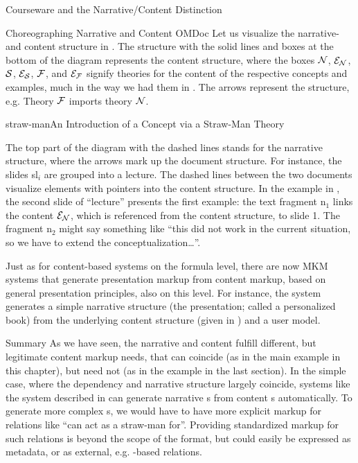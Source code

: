 \begin{tchapter}[id=courseware]{Courseware and the Narrative/Content Distinction}
\begin{tsection}[id=choreographing]{Choreographing  Narrative and Content OMDoc}
Let us visualize the narrative- and content structure in {}. The
structure with the solid lines and boxes at the bottom of the diagram represents the
content structure, where the boxes $\cal N$, $\cal E_N$, $\cal S$, $\cal E_S$,
$\cal F$, and $\cal E_F$ signify theories for the content of the respective
concepts and examples, much in the way we had them in
{}. The arrows represent the
{} structure, e.g. Theory $\cal F$ imports theory
$\cal N$.

\begin{myfig}{straw-man}{An Introduction of a Concept via a Straw-Man Theory}
  
\end{myfig}

The top part of the diagram with the dashed lines stands for the narrative structure,
where the arrows mark up the document structure. For instance, the slides {sl$_i$} are
grouped into a lecture. The dashed lines between the two documents visualize {}
elements with pointers into the content structure. In the example in
{}, the second slide of ``lecture'' presents the first example: the
text fragment {n$_1$} links the content $\cal E_N$, which is referenced from the content
structure, to slide 1. The fragment {n$_2$} might say something like ``this did not work in
the current situation, so we have to extend the conceptualization\ldots''.

Just as for content-based systems on the formula level, there are now MKM systems that
generate presentation markup from content markup, based on general presentation
principles, also on this level. For instance, the {}
system~\cite{MelBue:krma03} generates a simple narrative structure (the
presentation; called a personalized book) from the underlying content structure (given in
{\omdoc}) and a user model.
\end{tsection}

\begin{tsection}[id=courseware-summary]{Summary}
As we have seen, the narrative and content fulfill different, but legitimate
content markup needs, that can coincide (as in the main example in this chapter),
but need not (as in the example in the last section). In the simple case, where
the dependency and narrative structure largely coincide, systems like the
{\activemath} system described in {} can generate narrative
{\omdoc}s from content {\omdoc}s automatically. To generate more complex
{s}, we would have to
have more explicit markup for relations like ``can act as a straw-man for''.
Providing standardized markup for such relations is beyond the scope of the
{\omdoc} format, but could easily be expressed as metadata, or as external, e.g.
{\rdf}-based relations.
\end{tsection}
\end{tchapter}


